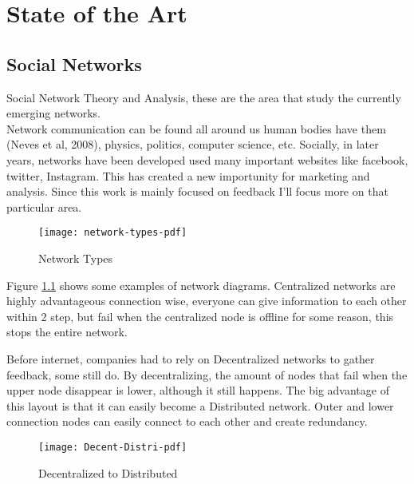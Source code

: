 \chapter{State of the Art}
\label{cha:SotA}


\section{Social Networks}
\label{sec:SocialNet}

\par
Social Network Theory and Analysis, these are the area that study the currently emerging networks. \\
Network communication can be found all around us human bodies have them (Neves et al, 2008), physics, politics, computer science, etc. Socially, in later years, networks have been developed used many important websites like facebook, twitter, Instagram. This has created a new importunity for marketing and analysis. 
Since this work is mainly focused on feedback I’ll focus more on that particular area.

\begin{figure}[htbp]
	\centering
	\texttt{[image: network-types-pdf]}
	\caption{Network Types}
	\label{fig:NetworkTypesImg}
\end{figure}

Figure \ref{fig:NetworkTypesImg} shows some examples of network diagrams. Centralized networks are highly advantageous  connection wise, everyone can give information to each other within 2 step, but fail when the centralized node is offline for some reason, this stops the entire network.
\par
Before internet, companies had to rely on Decentralized networks to gather feedback, some still do. By decentralizing, the amount of nodes that fail when the upper node disappear is lower, although it still happens. The big advantage of this layout is that it can easily become a Distributed network. Outer and lower connection nodes can easily connect to each other and create redundancy. 
\begin{figure}[htbp]
	\centering
	\texttt{[image: Decent-Distri-pdf]}
	\caption{Decentralized to Distributed}
	\label{fig:Decent-Distri}
\end{figure}

